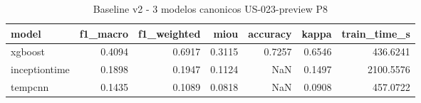 \begin{table}
\caption{Baseline v2 - 3 modelos canonicos US-023-preview P8}
\label{tab:baseline_v2_comparison}
\begin{tabular}{lrrrrrr}
\toprule
model & f1_macro & f1_weighted & miou & accuracy & kappa & train_time_s \\
\midrule
xgboost & 0.4094 & 0.6917 & 0.3115 & 0.7257 & 0.6546 & 436.6241 \\
inceptiontime & 0.1898 & 0.1947 & 0.1124 & NaN & 0.1497 & 2100.5576 \\
tempcnn & 0.1435 & 0.1089 & 0.0818 & NaN & 0.0908 & 457.0722 \\
\bottomrule
\end{tabular}
\end{table}
